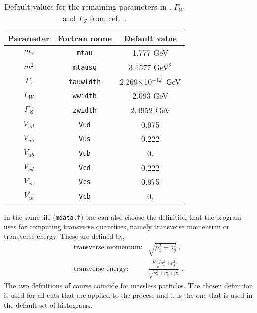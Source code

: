 \documentclass{article}
\begin{document}
\begin{table}
\begin{center}
\begin{tabular}{|c|c|c|} \hline
Parameter & Fortran name & Default value \\ 
\hline
$m_\tau$         & {\tt mtau}      & 1.777 GeV            \\
$m^2_\tau$& {\tt mtausq}  & 3.1577 GeV$^2$     \\
$\Gamma_\tau$    & {\tt tauwidth}& 2.269$\times$10$^{-12}$~GeV \\
$\Gamma_W$       & {\tt wwidth}  & 2.093 GeV               \\
$\Gamma_Z$       & {\tt zwidth}  & 2.4952 GeV               \\
$V_{ud}$         & {\tt Vud}     & 0.975                  \\
$V_{us}$         & {\tt Vus}     & 0.222             \\
$V_{ub}$         & {\tt Vub}     & 0.                     \\
$V_{cd}$         & {\tt Vcd}     & 0.222             \\
$V_{cs}$         & {\tt Vcs}     & 0.975                  \\
$V_{cb}$         & {\tt Vcb}     & 0.                     \\
\hline
\end{tabular}
\caption{Default values for the remaining parameters in \MCFM.
$\Gamma_W$ and $\Gamma_Z$ from ref.~\cite{Amsler:2008zzb}.}
\label{default} 
\end{center}
\end{table}

In the same file ({\tt mdata.f}) one can also choose the definition
that the program uses for computing transverse quantities, namely
transverse momentum or transverse energy. These are defined by,
\begin{eqnarray}
\mbox{transverse momentum:} & \sqrt{p_x^2+p_y^2} \; ,\nonumber \\
\mbox{transverse energy:}   &
 \frac{E \sqrt{p_x^2+p_y^2}}{\sqrt{p_x^2+p_y^2+p_z^2}} \; .
\end{eqnarray}
The two definitions of course coincide for massless particles.
The chosen definition is used for all cuts that are applied to the
process and it is the one that is used in the default set of histograms.
\end{document}
